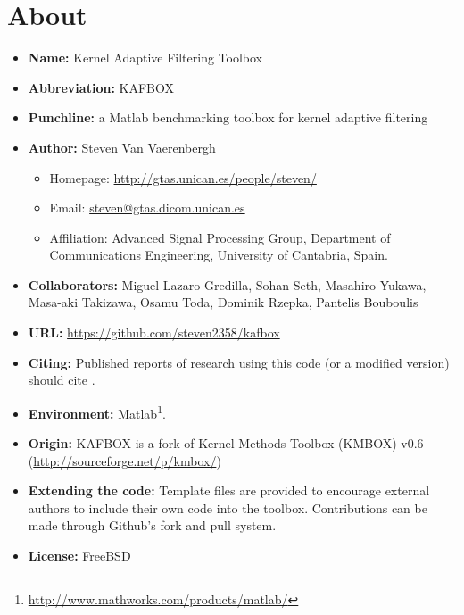 \documentclass[]{report}
\begin{document}


\chapter{About}
\begin{itemize}
\item {\bf Name:} Kernel Adaptive Filtering Toolbox
\item {\bf Abbreviation:} KAFBOX
\item {\bf Punchline:} a Matlab benchmarking toolbox for kernel adaptive filtering
\item {\bf Author:} Steven Van Vaerenbergh
  \begin{itemize}
  \item Homepage: \url{http://gtas.unican.es/people/steven/}
  \item Email: \url{steven@gtas.dicom.unican.es}
  \item Affiliation: Advanced Signal Processing Group, Department of Communications Engineering, University of Cantabria, Spain.
  \end{itemize}
\item {\bf Collaborators:} Miguel Lazaro-Gredilla, Sohan Seth, Masahiro Yukawa, Masa-aki Takizawa, Osamu Toda, Dominik Rzepka, Pantelis Bouboulis
\item {\bf URL:} \url{https://github.com/steven2358/kafbox}
\item {\bf Citing:} Published reports of research using this code (or a modified version) should cite \cite{vanvaerenbergh2013comparative}.
\item {\bf Environment:} Matlab\footnote{\url{http://www.mathworks.com/products/matlab/}}.
\item {\bf Origin:} KAFBOX is a fork of Kernel Methods Toolbox (KMBOX) v0.6 (\url{http://sourceforge.net/p/kmbox/})
\item {\bf Extending the code:} Template files are provided to encourage external authors to include their own code into the toolbox. Contributions can be made through Github's fork and pull system.
\item {\bf License:} FreeBSD
\end{itemize}





\end{document}
